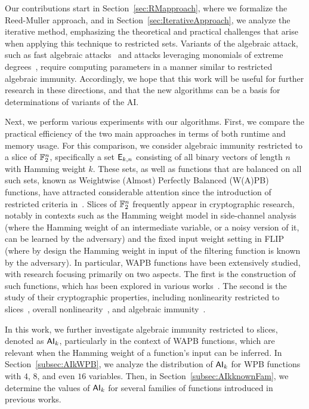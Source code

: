 \documentclass[11pt]{llncs}
\begin{document}
Our contributions start in Section~\ref{sec:RMapproach}, where we formalize the Reed-Muller approach, and in Section~\ref{sec:IterativeApproach}, we analyze the iterative method, emphasizing the theoretical and practical challenges that arise when applying this technique to restricted sets. 
Variants of the algebraic attack, such as fast algebraic attacks~\cite{C:Courtois03,FSE:Armknecht04} and attacks leveraging monomials of extreme degrees~\cite{CIC:MeauxWang25}, require computing parameters in a manner similar to restricted algebraic immunity. 
Accordingly, we hope that this work will be useful for further research in these directions, and that the new algorithms can be a basis for determinations of variants of the AI.



Next, we perform various experiments with our algorithms. 
First, we compare the practical efficiency of the two main approaches in terms of both runtime and memory usage. 
For this comparison, we consider algebraic immunity restricted to a slice of $\mathbb{F}_2^n$, specifically a set $\mathsf{E}_{k,n}$ consisting of all binary vectors of length $n$ with Hamming weight $k$.  
These sets, as well as functions that are balanced on all such sets, known as Weightwise (Almost) Perfectly Balanced (W(A)PB) functions, have attracted considerable attention since the introduction of restricted criteria in~\cite{TOSC:CarMeaRot17}.  
Slices of $\mathbb{F}_2^n$ frequently appear in cryptographic research, notably in contexts such as the Hamming weight model in side-channel analysis (where the Hamming weight of an intermediate variable, or a noisy version of it, can be learned by the adversary) and the fixed input weight setting in FLIP~\cite{EC:MJSC16} (where by design the Hamming weight in input of the filtering function is known by the adversary). 
In particular, WAPB functions have been extensively studied, with research focusing primarily on two aspects. The first is the construction of such functions, which has been explored in various works~\cite{TOSC:CarMeaRot17,CC:TangLiu19,DCC:LiuMes19,DAM:LiSu20,CC:MesSu21,DAM:ZhuSu22,CEC:MPJDL22,ACI:ManKuLar22,INDO:GinMea22,CC:MSLZ22,DAM:GuoSu22,DAM:ZLCQZ23,AMC:ZhangSu23,Mat:ZJZQ23,ASIACCS:YCL+23,CCDS:GinMea24,AMC:DalMal23,SAC:Meaux24,eprint:DalMalMea24}. 
The second is the study of their cryptographic properties, including nonlinearity restricted to slices~\cite{DAM:GinMea22}, overall nonlinearity~\cite{C2SI:GinMea23}, and algebraic immunity~\cite{Latin:GinMea23}.  

In this work, we further investigate algebraic immunity restricted to slices, denoted as $\mathsf{AI}_k$, particularly in the context of WAPB functions, which are relevant when the Hamming weight of a function’s input can be inferred. 
In Section~\ref{subsec:AIkWPB}, we analyze the distribution of $\mathsf{AI}_k$ for WPB functions with $4$, $8$, and even $16$ variables. 
Then, in Section~\ref{subsec:AIkknownFam}, we determine the values of $\mathsf{AI}_{k}$ for several families of functions introduced in previous works.  
\end{document}
